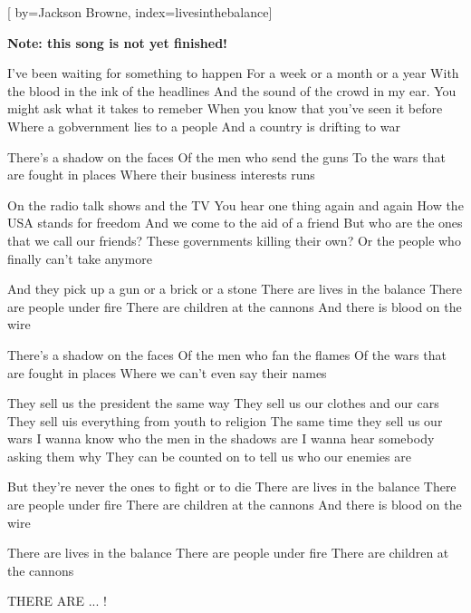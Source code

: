 
[%
    by={Jackson Browne},
    index={livesinthebalance}]


    \label{livesinthebalance}

    \textbf{Note: this song is not yet finished!}

    \beginverse
        I've been waiting for something to happen
        For a week or a month or a year
        With the blood in the ink of the headlines
        And the sound of the crowd in my ear.
        You might ask what it takes to remeber
        When you know that you've seen it before
        Where a gobvernment lies to a people
        And a country is drifting to war
    \endverse

    \beginchorus
        There's a shadow on the faces
        Of the men who send the guns
        To the wars that are fought in places
        Where their business interests runs
    \endchorus

    \beginverse
        On the radio talk shows and the TV
        You hear one thing again and again
        How the USA stands for freedom
        And we come to the aid of a friend
        But who are the ones that we call our friends?
        These governments killing their own?
        Or the people who finally can't take anymore
    \endverse

    \beginchorus
        And they pick up a gun or a brick or a stone
        There are lives in the balance 
        There are people under fire 
        There are children at the cannons 
        And there is blood on the wire
    \endchorus

    \beginchorus
        There's a shadow on the faces
        Of the men who fan the flames
        Of the wars that are fought in places
        Where we can't even say their names
    \endchorus

    \beginverse
        They sell us the president the same way
        They sell us our clothes and our cars
        They sell uis everything from youth to religion
        The same time they sell us our wars
        I wanna know who the men in the shadows are
        I wanna hear somebody asking them why
        They can be counted on to tell us who our enemies are
    \endverse

    \beginchorus
        But they're never the ones to fight or to die
        There are lives in the balance 
        There are people under fire 
        There are children at the cannons 
        And there is blood on the wire
    \endchorus

    \beginchorus
        There are lives in the balance
        There are people under fire
        There are children at the cannons

        THERE ARE ... !
    \endchorus
\endsong
